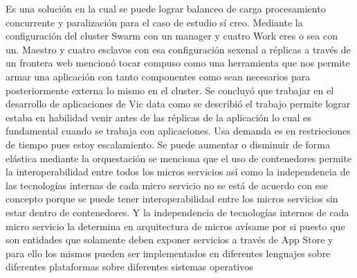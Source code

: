   Es una solución en la cual se puede lograr balanceo de carga procesamiento concurrente y paralización para el caso de estudio sí creo. Mediante la configuración del cluster Swarm con un manager y cuatro Work eres o sea con un. Maestro y cuatro esclavos con esa configuración sexenal a réplicas a través de un frontera web mencionó tocar compuso como una herramienta que nos permite armar una aplicación con tanto componentes como sean necesarios para posteriormente externa lo mismo en el cluster. Se concluyó que trabajar en el desarrollo de aplicaciones de Vic data como se describió el trabajo permite lograr estaba en habilidad venir antes de las réplicas de la aplicación lo cual es fundamental cuando se trabaja con aplicaciones. Usa demanda es en restricciones de tiempo pues estoy escalamiento. Se puede aumentar o disminuir de forma elástica mediante la orquestación se menciona que el uso de contenedores permite la interoperabilidad entre todos los micros servicios así como la independencia de las tecnologías internas de cada micro servicio no se está de acuerdo con ese concepto porque se puede tener interoperabilidad entre los micros servicios sin estar dentro de contenedores. Y la independencia de tecnologías internos de cada micro servicio la determina en arquitectura de micros avísame por si puesto que son entidades que solamente deben exponer servicios a través de App Store y para ello los mismos pueden ser implementados en diferentes lenguajes sobre diferentes plataformas sobre diferentes sistemas operativos